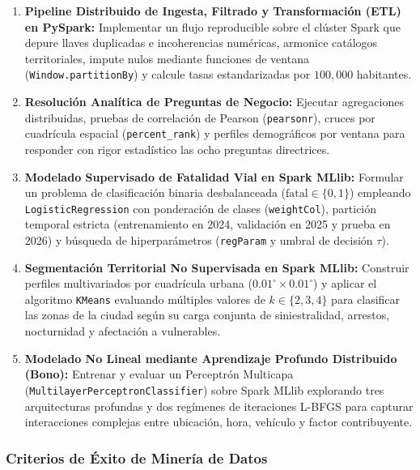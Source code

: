 \documentclass[11pt,a4paper]{article}
\begin{document}
\begin{enumerate}
    \item \textbf{Pipeline Distribuido de Ingesta, Filtrado y Transformación (ETL) en PySpark:} Implementar un flujo reproducible sobre el clúster Spark que depure llaves duplicadas e incoherencias numéricas, armonice catálogos territoriales, impute nulos mediante funciones de ventana (\texttt{Window.partitionBy}) y calcule tasas estandarizadas por $100,000$ habitantes.
    \item \textbf{Resolución Analítica de Preguntas de Negocio:} Ejecutar agregaciones distribuidas, pruebas de correlación de Pearson (\texttt{pearsonr}), cruces por cuadrícula espacial (\texttt{percent\_rank}) y perfiles demográficos por ventana para responder con rigor estadístico las ocho preguntas directrices.
    \item \textbf{Modelado Supervisado de Fatalidad Vial en Spark MLlib:} Formular un problema de clasificación binaria desbalanceada ($\text{fatal} \in \{0, 1\}$) empleando \texttt{LogisticRegression} con ponderación de clases (\texttt{weightCol}), partición temporal estricta (entrenamiento en 2024, validación en 2025 y prueba en 2026) y búsqueda de hiperparámetros (\texttt{regParam} y umbral de decisión $\tau$).
    \item \textbf{Segmentación Territorial No Supervisada en Spark MLlib:} Construir perfiles multivariados por cuadrícula urbana ($0.01^\circ \times 0.01^\circ$) y aplicar el algoritmo \texttt{KMeans} evaluando múltiples valores de $k \in \{2, 3, 4\}$ para clasificar las zonas de la ciudad según su carga conjunta de siniestralidad, arrestos, nocturnidad y afectación a vulnerables.
    \item \textbf{Modelado No Lineal mediante Aprendizaje Profundo Distribuido (Bono):} Entrenar y evaluar un Perceptrón Multicapa (\texttt{MultilayerPerceptronClassifier}) sobre Spark MLlib explorando tres arquitecturas profundas y dos regímenes de iteraciones L-BFGS para capturar interacciones complejas entre ubicación, hora, vehículo y factor contribuyente.
\end{enumerate}

\subsubsection{Criterios de Éxito de Minería de Datos}
\end{document}
